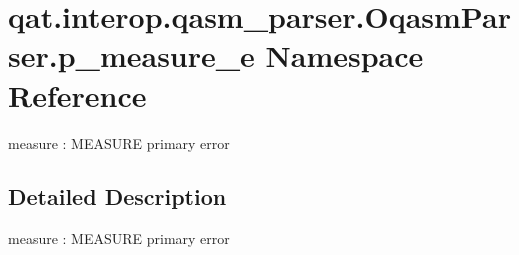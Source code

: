 \hypertarget{namespaceqat_1_1interop_1_1qasm__parser_1_1OqasmParser_1_1p__measure__e}{\section{qat.\-interop.\-qasm\-\_\-parser.\-Oqasm\-Parser.\-p\-\_\-measure\-\_\-e Namespace Reference}
\label{namespaceqat_1_1interop_1_1qasm__parser_1_1OqasmParser_1_1p__measure__e}
}


measure \-: M\-E\-A\-S\-U\-R\-E primary error  




\subsection{Detailed Description}
measure \-: M\-E\-A\-S\-U\-R\-E primary error 